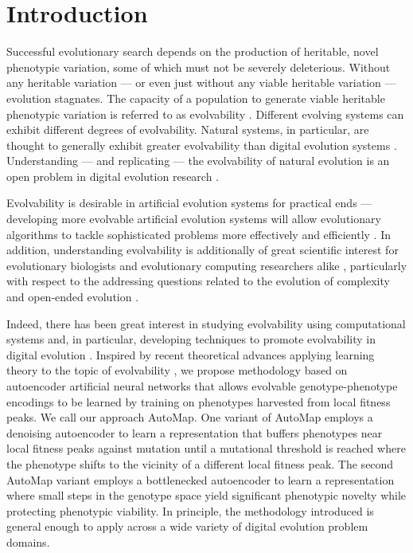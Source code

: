 \section{Introduction} \label{sec:introduction}

Successful evolutionary search depends on the production of heritable, novel phenotypic variation, some of which must not be severely deleterious.
Without any heritable variation --- or even just without any viable heritable variation --- evolution stagnates.
The capacity of a population to generate viable heritable phenotypic variation is referred to as evolvability \cite{tarapore2015evolvability}.
Different evolving systems can exhibit different degrees of evolvability.
Natural systems, in particular, are thought to generally exhibit greater evolvability than digital evolution systems \cite{wagner1996perspective}.
Understanding --- and replicating --- the evolvability of natural evolution is an open problem in digital evolution research \cite{mengistu2016evolvability}.

Evolvability is desirable in artificial evolution systems for practical ends --- developing more evolvable artificial evolution systems will allow evolutionary algorithms to tackle sophisticated problems more effectively and efficiently \cite{bentley1999three, reisinger2007acquiring}.
In addition, understanding evolvability is additionally of great scientific interest for evolutionary biologists and evolutionary computing researchers alike \cite{mengistu2016evolvability, pigliucci2008evolvability}, particularly with respect to the addressing questions related to the evolution of complexity and open-ended evolution \cite{kirschner1998evolvability, hu2010evolvability}.

Indeed, there has been great interest in studying evolvability using computational systems and, in particular, developing techniques to promote evolvability in digital evolution \cite{kashtan2005spontaneous, mengistu2016evolvability, reisinger2005towards, cheney2013unshackling, nguyen2015innovation, lehman2013evolvability}.
Inspired by recent theoretical advances applying learning theory to the topic of evolvability \cite{kouvaris2017evolution, watson2016can}, we propose methodology based on autoencoder artificial neural networks that allows evolvable genotype-phenotype encodings to be learned by training on phenotypes harvested from local fitness peaks.
We call our approach AutoMap.
One variant of AutoMap employs a denoising autoencoder to learn a representation that buffers phenotypes near local fitness peaks against mutation until a mutational threshold is reached where the phenotype shifts to the vicinity of a different local fitness peak.
The second AutoMap variant employs a bottlenecked autoencoder to learn a representation where small steps in the genotype space yield significant phenotypic novelty while protecting phenotypic viability.
In principle, the methodology introduced is general enough to apply across a wide variety of digital evolution problem domains.
